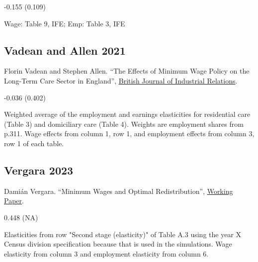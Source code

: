 \vspace{0.7em}

 -0.155 (0.109)

\vspace{0.7em}

 Wage: Table 9, IFE; Emp: Table 3, IFE

\subsection*{Vadean and Allen 2021}
\vspace{-0.7em}

\noindent Florin Vadean and Stephen Allen. ``The Effects of Minimum Wage Policy on the Long-Term Care Sector in England'', \href{https://doi.org/10.1111/bjir.12572}{British Journal of Industrial Relations}.

\vspace{0.7em}

 -0.036 (0.402)

\vspace{0.7em}

 Weighted average of the employment and earnings elasticities for residential care (Table 3) and domiciliary care (Table 4). Weights are employment shares from p.311. Wage effects from column 1, row 1, and employment effects from column 3, row 1 of each table.

\subsection*{Vergara 2023}
\vspace{-0.7em}

\noindent Damián Vergara. ``Minimum Wages and Optimal Redistribution'', \href{https://dvergarad.github.io/files/JMP_DV.pdf}{Working Paper}.

\vspace{0.7em}

 0.448 (NA)

\vspace{0.7em}

 Elasticities from row "Second stage (elasticity)" of Table A.3 using the year X Census division specification because that is used in the simulations. Wage elasticity from column 3 and employment elasticity from column 6.

